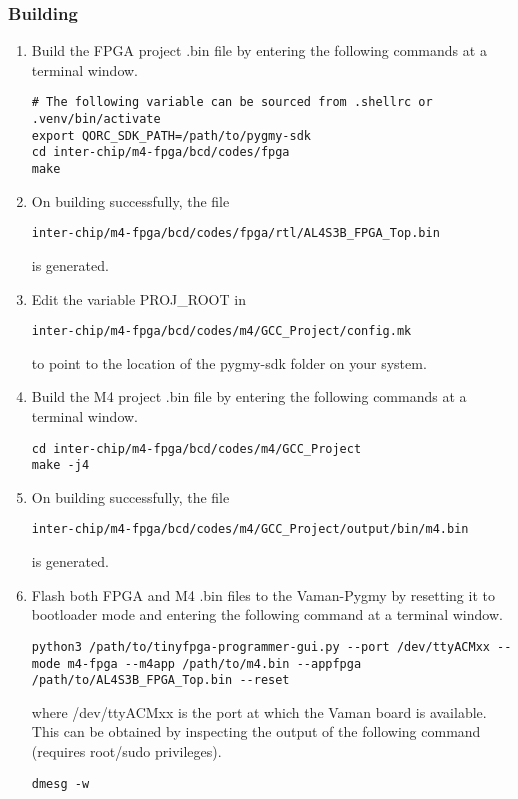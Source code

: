 \subsubsection{Building}
\begin{enumerate}
    \item Build the FPGA project .bin file by entering the following commands at
    a terminal window.
    \begin{lstlisting}
# The following variable can be sourced from .shellrc or .venv/bin/activate
export QORC_SDK_PATH=/path/to/pygmy-sdk
cd inter-chip/m4-fpga/bcd/codes/fpga
make
    \end{lstlisting}
    \item On building successfully, the file
    \begin{lstlisting}
inter-chip/m4-fpga/bcd/codes/fpga/rtl/AL4S3B_FPGA_Top.bin
    \end{lstlisting}
    is generated.
    \item Edit the variable PROJ\_ROOT in
    \begin{lstlisting}
inter-chip/m4-fpga/bcd/codes/m4/GCC_Project/config.mk
    \end{lstlisting}
    to point to the location of the pygmy-sdk folder on your system.
    \item Build the M4 project .bin file by entering the following commands at a
    terminal window.
    \begin{lstlisting}
cd inter-chip/m4-fpga/bcd/codes/m4/GCC_Project
make -j4
    \end{lstlisting}
    \item On building successfully, the file
    \begin{lstlisting}
inter-chip/m4-fpga/bcd/codes/m4/GCC_Project/output/bin/m4.bin
    \end{lstlisting}
    is generated.
    \item Flash both FPGA and M4 .bin files to the Vaman-Pygmy by resetting it
    to bootloader mode and entering the following command at a terminal window.
    \begin{lstlisting}
python3 /path/to/tinyfpga-programmer-gui.py --port /dev/ttyACMxx --mode m4-fpga --m4app /path/to/m4.bin --appfpga /path/to/AL4S3B_FPGA_Top.bin --reset
    \end{lstlisting}
    where /dev/ttyACMxx is the port at which the Vaman board is available. This
    can be obtained by inspecting the output of the following command (requires
    root/sudo privileges).
    \begin{lstlisting}
dmesg -w
    \end{lstlisting}
\end{enumerate}

